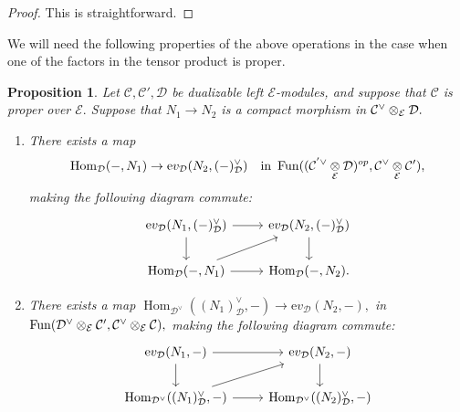 \documentclass[11pt,leqno]{amsart}
\newtheorem{prop}[theo]{Proposition}
\numberwithin{equation}{section}
\def\Hom{\operatorname{Hom}}
\newcommand{\tens}[1]{%
  \mathbin{\mathop{\otimes}\displaylimits_{#1}}%
}
\newcommand{\ev}{\mathrm ev}
\newcommand{\cD}{{\mathcal D}}
\newcommand{\cC}{{\mathcal C}}
\newcommand{\cE}{{\mathcal E}}
\newcommand{\Fun}{\operatorname{Fun}}
\begin{document}
\begin{proof}
This is straightforward.
\end{proof}

We will need the following properties of the above operations in the case when one of the factors in the tensor product is proper.

\begin{prop}\label{prop:general_diagonal_arrows}
Let $\cC,\cC',\cD$ be dualizable left $\cE$-modules, and suppose that $\cC$ is proper over $\cE.$ Suppose that $N_1\to N_2$ is a compact morphism in $\cC^{\vee}\tens{\cE}\cD.$ 
\begin{enumerate}[label=(\roman*), ref=(\roman*)]
\item There exists a map 
\begin{equation*}
\Hom_{\cD}(-,N_1)\to \ev_{\cD}(N_2,(-)_{\cD}^{\vee})\quad\text{in }\Fun((\cC^{'\vee}\tens{\cE}\cD)^{op},\cC^{\vee}\tens{\cE}\cC'),
\end{equation*}  making the following diagram commute:
\begin{equation*}
		\begin{tikzcd}
			\ev_{\cD}(N_1,(-)_{\cD}^{\vee})\ar[d]\ar[r] & \ev_{\cD}(N_2,(-)_{\cD}^{\vee})\ar[d]\\
			\Hom_{\cD}(-,N_1)\ar[r]\ar[ru] &  \Hom_{\cD}(-,N_2).
		\end{tikzcd}	
\end{equation*}\label{first_diagonal_arrow}
\item There exists a map $\Hom_{\cD^{\vee}}((N_1)_{\cD}^{\vee},-)\to \ev_{\cD}(N_2,-),$ in $\Fun(\cD^{\vee}\tens{\cE}\cC',\cC^{\vee}\tens{\cE}\cC),$ making the following diagram commute:
\begin{equation*}
\begin{tikzcd}
\ev_{\cD}(N_1,-)\ar[r]\ar[d] & \ev_{\cD}(N_2,-)\ar[d]\\
\Hom_{\cD^{\vee}}((N_1)_{\cD}^{\vee},-)\ar[r]\ar[ru] & \Hom_{\cD^{\vee}}((N_2)_{\cD}^{\vee},-)
\end{tikzcd}
\end{equation*}\label{second_diagonal_arrow}
\end{enumerate}
\end{prop}
\end{document}
